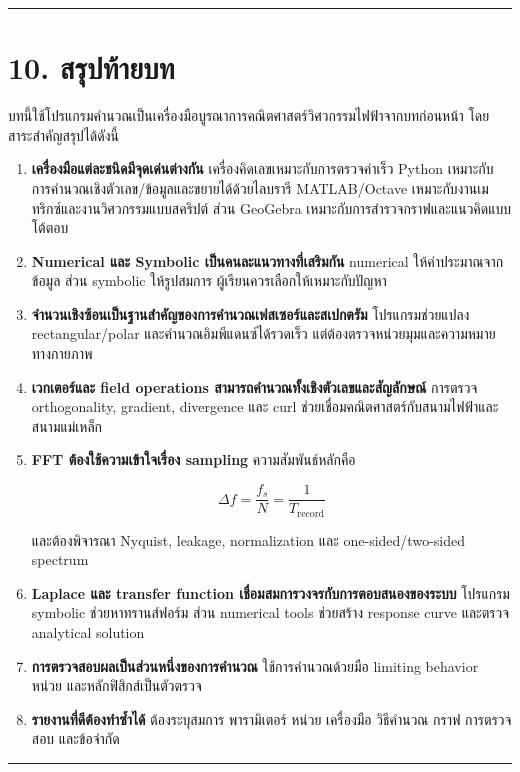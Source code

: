 \par\noindent\rule{\textwidth}{0.4pt}\par

\section{10. สรุปท้ายบท}

บทนี้ใช้โปรแกรมคำนวณเป็นเครื่องมือบูรณาการคณิตศาสตร์วิศวกรรมไฟฟ้าจากบทก่อนหน้า โดยสาระสำคัญสรุปได้ดังนี้

\begin{enumerate}
    \item \textbf{เครื่องมือแต่ละชนิดมีจุดเด่นต่างกัน}
    เครื่องคิดเลขเหมาะกับการตรวจค่าเร็ว Python เหมาะกับการคำนวณเชิงตัวเลข/ข้อมูลและขยายได้ด้วยไลบรารี MATLAB/Octave เหมาะกับงานเมทริกซ์และงานวิศวกรรมแบบสคริปต์ ส่วน GeoGebra เหมาะกับการสำรวจกราฟและแนวคิดแบบโต้ตอบ
    \item \textbf{Numerical และ Symbolic เป็นคนละแนวทางที่เสริมกัน}
    numerical ให้ค่าประมาณจากข้อมูล ส่วน symbolic ให้รูปสมการ ผู้เรียนควรเลือกให้เหมาะกับปัญหา
    \item \textbf{จำนวนเชิงซ้อนเป็นฐานสำคัญของการคำนวณเฟสเซอร์และสเปกตรัม}
    โปรแกรมช่วยแปลง rectangular/polar และคำนวณอิมพีแดนซ์ได้รวดเร็ว แต่ต้องตรวจหน่วยมุมและความหมายทางกายภาพ
    \item \textbf{เวกเตอร์และ field operations สามารถคำนวณทั้งเชิงตัวเลขและสัญลักษณ์}
    การตรวจ orthogonality, gradient, divergence และ curl ช่วยเชื่อมคณิตศาสตร์กับสนามไฟฟ้าและสนามแม่เหล็ก
    \item \textbf{FFT ต้องใช้ความเข้าใจเรื่อง sampling}
    ความสัมพันธ์หลักคือ

    \[
    \Delta f=\frac{f_s}{N}=\frac{1}{T_{\text{record}}}
    \]

    และต้องพิจารณา Nyquist, leakage, normalization และ one-sided/two-sided spectrum
    \item \textbf{Laplace และ transfer function เชื่อมสมการวงจรกับการตอบสนองของระบบ}
    โปรแกรม symbolic ช่วยหาทรานส์ฟอร์ม ส่วน numerical tools ช่วยสร้าง response curve และตรวจ analytical solution
    \item \textbf{การตรวจสอบผลเป็นส่วนหนึ่งของการคำนวณ}
    ใช้การคำนวณด้วยมือ limiting behavior หน่วย และหลักฟิสิกส์เป็นตัวตรวจ
    \item \textbf{รายงานที่ดีต้องทำซ้ำได้}
    ต้องระบุสมการ พารามิเตอร์ หน่วย เครื่องมือ วิธีคำนวณ กราฟ การตรวจสอบ และข้อจำกัด
\end{enumerate}

\par\noindent\rule{\textwidth}{0.4pt}\par

